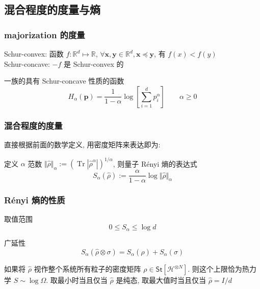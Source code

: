 \documentclass[12pt,hyperref={CJKbookmarks=true}]{beamer}
\renewcommand*{\vec}[1]{\bm{#1}}
\newcommand{\Tr}{\operatorname{Tr}}
\newcommand{\St}{{\mathsf{St}}}
\begin{document}
\subsection{混合程度的度量与熵} %
\label{sub:mixedness_and_entropy}
\begin{frame}
    \frametitle{majorization 的度量}
    \begin{definition}
        Schur-convex: 函数 $f:\mathbb R^d\mapsto\mathbb R$, 
        $\forall \vec x,\vec y\in\mathbb R^d, \vec x\preceq \vec y$, 有 $f(x)<f(y)$ \\
        Schur-concave: $-f$ 是 Schur-convex 的
    \end{definition}\pause
    \begin{definition}[R\'enyi 熵]
        一族的具有 Schur-concave 性质的函数
        \begin{equation}
            H_\alpha(\vec p) = \frac1{1-\alpha}\log\left[\sum_{i=1}^dp_i^\alpha\right]\qquad\alpha\ge 0
        \end{equation}
    \end{definition}
\end{frame}
\begin{frame}
    \frametitle{混合程度的度量}
    直接根据前面的数学定义, 用密度矩阵来表达即为:
    \begin{definition}[量子 R\'enyi 熵]
        定义 $\alpha$ 范数 
        $\Vert\hat\rho\Vert_\alpha := \left(\Tr|\hat\rho^\alpha|\right)^{1/\alpha}$, 
        则量子 R\'enyi 熵的表达式
        \begin{equation}
            S_\alpha(\hat\rho) := \frac{\alpha}{1-\alpha}\log\Vert\hat\rho\Vert_\alpha
        \end{equation}
    \end{definition}
\end{frame}
\begin{frame}
    \frametitle{R\'enyi 熵的性质}
    取值范围
    \begin{equation}
        0\le S_\alpha\le\log d
    \end{equation}\pause

    广延性
    \begin{equation}
        S_\alpha(\hat\rho\otimes\sigma) = S_\alpha(\hat\rho) + S_\alpha(\sigma)
    \end{equation}\pause

    如果将 $\hat \rho$ 视作整个系统所有粒子的密度矩阵 $\rho\in\St[\mathcal H^{\otimes N}]$.
    则这个上限恰为热力学 $S\sim\log\Omega$.
    取最小时当且仅当 $\hat\rho$ 是纯态, 取最大值时当且仅当 $\hat\rho = I/d$
\end{frame}
\end{document}
